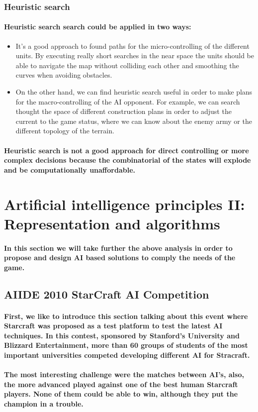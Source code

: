 \documentclass[a4paper,10pt]{article}
\newcommand{\p}[1]{\paragraph{\indent\textnormal{#1}}}
\begin{document}
  \subsubsection{Heuristic search}

    \p{Heuristic search search could be applied in two ways:}

    \begin{itemize}
     \item It's a good approach to found paths for the micro-controlling of the different units. By executing really short searches in the near space the units should be able to navigate the map without colliding each other and smoothing the curves when avoiding obstacles.
     \item On the other hand, we can find heuristic search useful in order to make plans for the macro-controlling of the AI opponent. For example, we can search thought the space of different construction plans in order to adjust the current to the game status, where we can know about the enemy army or the different topology of the terrain.
    \end{itemize}

  \p{Heuristic search is not a good approach for direct controlling or more complex decisions because the combinatorial of the states will explode and be computationally unaffordable.}




\newpage
\section{Artificial intelligence principles II: Representation and algorithms}

    \p{In this section we will take further the above analysis in order to propose and design AI based solutions to comply the needs of the game.}

    \subsection{AIIDE 2010 StarCraft AI Competition}

      \p{First, we like to introduce this section talking about this event where Starcraft was proposed as a test platform to test the latest AI techniques. In this contest, sponsored by Stanford's University and Blizzard Entertainment, more than 60 groups of students of the most important universities competed developing different AI for Stracraft.}

      \p{The most interesting challenge were the matches between AI's, also, the more advanced played against one of the best human Starcraft players. None of them could be able to win, although they put the champion in a trouble.}
\end{document}
